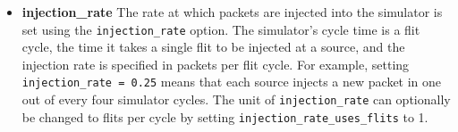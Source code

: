 \begin{itemize}
    \item \textbf{injection\_rate} The rate at which packets are injected into the simulator is set using the \texttt{injection\_rate} option. The simulator's cycle time is a flit cycle, the time it takes a single flit to be injected at a source, and the injection rate is specified in packets per flit cycle. For example, setting \texttt{injection\_rate = 0.25} means that each source injects a new packet in one out of every four simulator cycles. The unit of \texttt{injection\_rate} can optionally be changed to flits per cycle by setting \texttt{injection\_rate\_uses\_flits} to 1.
\end{itemize}

